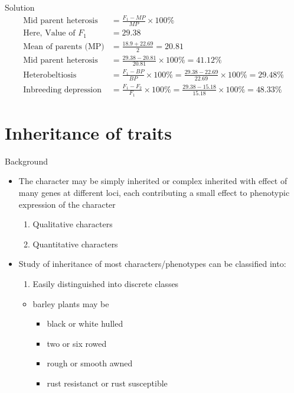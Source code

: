 \documentclass[11pt,dvipsnames,ignorenonframetext,aspectratio=169]{beamer}
\providecommand{\tightlist}{%
  \setlength{\itemsep}{0pt}\setlength{\parskip}{0pt}}
\begin{document}
\begin{frame}{Solution}
\protect\hypertarget{solution}{}
\begin{equation}
\begin{aligned}
\text{Mid parent heterosis} &= \frac{F_1 - MP}{MP} \times 100\% \\
\text{Here, Value of } F_1 &= 29.38 \\
\text{Mean of parents (MP)} &= \frac{18.9+22.69}{2} = 20.81 \\
\text{Mid parent heterosis } &= \frac{29.38-20.81}{20.81} \times 100\% = 41.12\% \\
\text{Heterobeltiosis} &= \frac{F_1-BP}{BP} \times 100\% = \frac{29.38-22.69}{22.69} \times 100\% = 29.48\% \\
\text{Inbreeding depression} &= \frac{F_1-F_2}{F_1} \times 100\% = \frac{29.38-15.18}{15.18} \times 100\%= 48.33\%
\end{aligned}
\nonumber
\end{equation}
\end{frame}

\hypertarget{inheritance-of-traits}{%
\section{Inheritance of traits}\label{inheritance-of-traits}}

\begin{frame}{Background}
\protect\hypertarget{background}{}
\begin{itemize}
\tightlist
\item
  The character may be simply inherited or complex inherited with effect
  of many genes at different loci, each contributing a small effect to
  phenotypic expression of the character

  \begin{enumerate}
  \tightlist
  \item
    Qualitative characters
  \item
    Quantitative characters
  \end{enumerate}
\item
  Study of inheritance of most characters/phenotypes can be classified
  into:

  \begin{enumerate}
  \tightlist
  \item
    Easily distinguished into discrete classes
  \end{enumerate}

  \begin{itemize}
  \tightlist
  \item
    barley plants may be

    \begin{itemize}
    \tightlist
    \item
      black or white hulled
    \item
      two or six rowed
    \item
      rough or smooth awned
    \item
      rust resistanct or rust susceptible
    \end{itemize}
  \end{itemize}
\end{itemize}
\end{frame}
\end{document}
